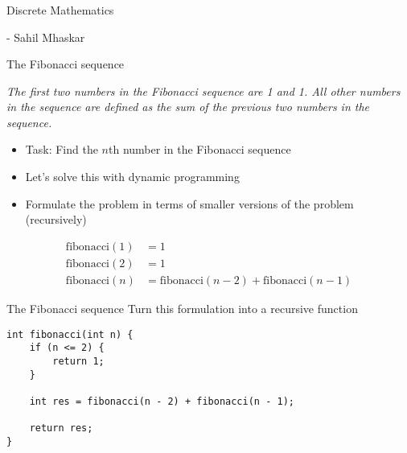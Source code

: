    \begin{frame}[fragile]\frametitle{}
\begin{center}
{\Large Discrete Mathematics}

 - Sahil Mhaskar

\end{center}
\end{frame}

   \begin{frame}[fragile]{The Fibonacci sequence}

    \textit{The first two numbers in the Fibonacci sequence are 1 and 1. All
            other numbers in the sequence are defined as the sum of the previous two
            numbers in the sequence.}

    \begin{itemize}
        \item Task: Find the $n$th number in the Fibonacci sequence
        \item Let's solve this with dynamic programming
        \item Formulate the problem in terms of smaller versions of the problem (recursively)
    \end{itemize}

    \begin{align*}
        \mathrm{fibonacci}(1) &= 1\\
        \mathrm{fibonacci}(2) &= 1\\
        \mathrm{fibonacci}(n) &= \mathrm{fibonacci}(n - 2) + \mathrm{fibonacci}(n - 1)
    \end{align*}
\end{frame}

   \begin{frame}[fragile]{The Fibonacci sequence}
Turn this formulation into a recursive function


    \begin{lstlisting}
int fibonacci(int n) {
    if (n <= 2) {
        return 1;
    }

    int res = fibonacci(n - 2) + fibonacci(n - 1);

    return res;
}
    \end{lstlisting}
\end{frame}



